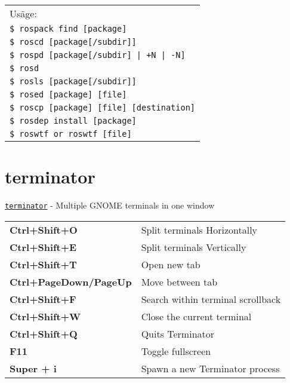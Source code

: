 \documentclass[10pt,landscape]{article}
\begin{document}
\begin{multicols}{3}
\vfill
\columnbreak

\begin{tabular}{l}
Us\=age:\\
\hspace{3ex} \texttt{\$ rospack find [package]}\\
\hspace{3ex} \texttt{\$ roscd [package[/subdir]]}\\
\hspace{3ex} \texttt{\$ rospd [package[/subdir] | +N | -N]}\\
\hspace{3ex} \texttt{\$ rosd}\\
\hspace{3ex} \texttt{\$ rosls [package[/subdir]]}\\
\hspace{3ex} \texttt{\$ rosed [package] [file]}\\
\hspace{3ex} \texttt{\$ roscp [package] [file] [destination]}\\
\hspace{3ex} \texttt{\$ rosdep install [package]}\\
\hspace{3ex} \texttt{\$ roswtf or roswtf [file]}\\
\end{tabular}

\section*{terminator}
\vspace{-0.7em}
\texttt{\href{https://linux.die.net/man/1/terminator}{terminator}} - Multiple GNOME terminals in one window
\begin{tabular}{l l}
\textbf{Ctrl+Shift+O} & Split terminals Horizontally \\
\textbf{Ctrl+Shift+E} & Split terminals Vertically \\
\textbf{Ctrl+Shift+T} & Open new tab \\
\textbf{Ctrl+PageDown/PageUp} & Move between tab \\
\textbf{Ctrl+Shift+F} & Search within terminal scrollback \\
\textbf{Ctrl+Shift+W} & Close the current terminal \\
\textbf{Ctrl+Shift+Q} & Quits Terminator \\
\textbf{F11} & Toggle fullscreen \\
\textbf{Super + i} & Spawn a new Terminator process
\end{tabular}
\vfill

\end{multicols}
 
\end{document}

